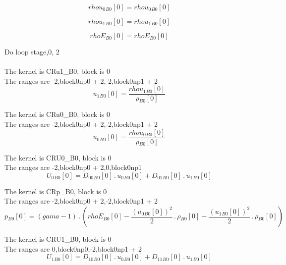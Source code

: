 \documentclass{article}
\begin{document}
\begin{dmath}{rhou_{0}{_{B0}}}[{0}] = {rhou_{0}{_{B0}}}[{0}]\end{dmath}

\begin{dmath}{rhou_{1}{_{B0}}}[{0}] = {rhou_{1}{_{B0}}}[{0}]\end{dmath}

\begin{dmath}{rhoE{_{B0}}}[{0}] = {rhoE{_{B0}}}[{0}]\end{dmath}

\noindent Do loop stage,0, 2\\
\\\noindent The kernel is CRu1_B0, block is 0\\\noindent The ranges are -2,block0np0 + 2,-2,block0np1 + 2\\\begin{dmath}{u_{1}{_{B0}}}[{0}] = \frac{{rhou_{1}{_{B0}}}[{0}]}{{\rho{_{B0}}}[{0}]}\end{dmath}

\noindent The kernel is CRu0_B0, block is 0\\\noindent The ranges are -2,block0np0 + 2,-2,block0np1 + 2\\\begin{dmath}{u_{0}{_{B0}}}[{0}] = \frac{{rhou_{0}{_{B0}}}[{0}]}{{\rho{_{B0}}}[{0}]}\end{dmath}

\noindent The kernel is CRU0_B0, block is 0\\\noindent The ranges are -2,block0np0 + 2,0,block0np1\\\begin{dmath}{U_{0}{_{B0}}}[{0}] = {D_{00}{_{B0}}}[{0}] \,.\, {u_{0}{_{B0}}}[{0}] + {D_{01}{_{B0}}}[{0}] \,.\, {u_{1}{_{B0}}}[{0}]\end{dmath}

\noindent The kernel is CRp_B0, block is 0\\\noindent The ranges are -2,block0np0 + 2,-2,block0np1 + 2\\\begin{dmath}{p{_{B0}}}[{0}] = \left(gama - 1\right) \,.\, \left({rhoE{_{B0}}}[{0}] - \frac{\left({u_{0}{_{B0}}}[{0}] \right)^{2}}{2} \,.\, {\rho{_{B0}}}[{0}] - \frac{\left({u_{1}{_{B0}}}[{0}] \right)^{2}}{2} \,.\, 
{\rho{_{B0}}}[{0}]\right)\end{dmath}

\noindent The kernel is CRU1_B0, block is 0\\\noindent The ranges are 0,block0np0,-2,block0np1 + 2\\\begin{dmath}{U_{1}{_{B0}}}[{0}] = {D_{10}{_{B0}}}[{0}] \,.\, {u_{0}{_{B0}}}[{0}] + {D_{11}{_{B0}}}[{0}] \,.\, {u_{1}{_{B0}}}[{0}]\end{dmath}
\end{document}
